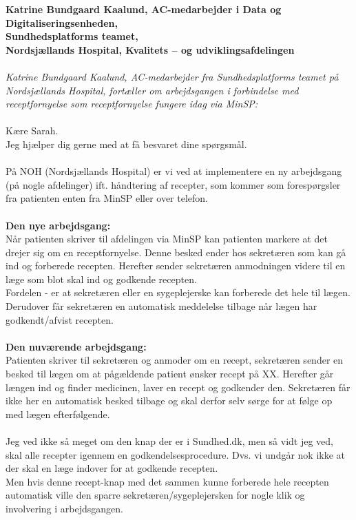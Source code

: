 \textbf{Katrine Bundgaard Kaalund, AC-medarbejder i Data og Digitaliseringsenheden,\\
	Sundhedsplatforms teamet,  \\
	Nordsjællands Hospital, Kvalitets – og udviklingsafdelingen}\\\\
\textit{Katrine Bundgaard Kaalund, AC-medarbejder fra Sundhedsplatforms teamet på Nordsjællands Hospital, fortæller om arbejdsgangen i forbindelse med receptfornyelse som receptfornyelse fungere idag via MinSP:}\\\\
Kære Sarah.\\
Jeg hjælper dig gerne med at få besvaret dine spørgsmål.\\\\
På NOH (Nordsjællands Hospital) er vi ved at implementere en ny arbejdsgang (på nogle afdelinger) ift. håndtering af recepter, som kommer som forespørgsler fra patienten enten fra MinSP eller over telefon.\\\\
\textbf{Den nye arbejdsgang:} \\
Når patienten skriver til afdelingen via MinSP kan patienten markere at det drejer sig om en receptfornyelse. Denne besked ender hos sekretæren som kan gå ind og forberede recepten. Herefter sender sekretæren anmodningen videre til en læge som blot skal ind og godkende recepten. \\
Fordelen - er at sekretæren eller en sygeplejerske kan forberede det hele til lægen. Derudover får sekretæren en automatisk meddelelse tilbage når lægen har godkendt/afvist recepten.\\\\
\textbf{Den nuværende arbejdsgang:}\\
Patienten skriver til sekretæren og anmoder om en recept, sekretæren sender en besked til lægen om at pågældende patient ønsker recept på XX. Herefter går længen ind og finder medicinen, laver en recept og godkender den. Sekretæren får ikke her en automatisk besked tilbage og skal derfor selv sørge for at følge op med lægen efterfølgende.\\\\
Jeg ved ikke så meget om den knap der er i Sundhed.dk, men så vidt jeg ved, skal alle recepter igennem en godkendelsesprocedure. Dvs. vi undgår nok ikke at der skal en læge indover for at godkende recepten. \\
Men hvis denne recept-knap med det sammen kunne forberede hele recepten automatisk ville den sparre sekretæren/sygeplejersken for nogle klik og involvering i arbejdsgangen. \\
